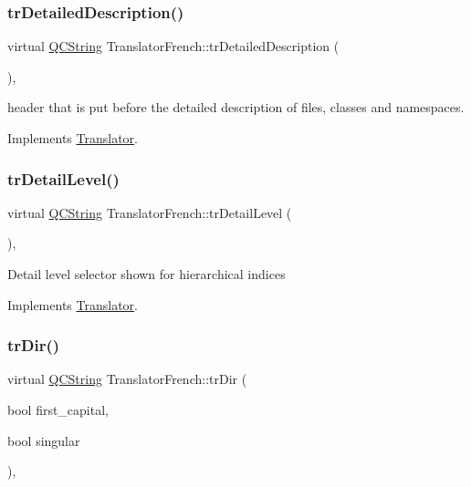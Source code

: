 \subsubsection{\texorpdfstring{trDetailedDescription()}{trDetailedDescription()}}
{\footnotesize\ttfamily virtual \mbox{\hyperlink{class_q_c_string}{Q\+C\+String}} Translator\+French\+::tr\+Detailed\+Description (\begin{DoxyParamCaption}{ }\end{DoxyParamCaption})\hspace{0.3cm}{\ttfamily [inline]}, {\ttfamily [virtual]}}

header that is put before the detailed description of files, classes and namespaces. 

Implements \mbox{\hyperlink{class_translator}{Translator}}.

\mbox{\label{class_translator_french_a60266dceed1707416a172e84c5279ef8}} 
\subsubsection{\texorpdfstring{trDetailLevel()}{trDetailLevel()}}
{\footnotesize\ttfamily virtual \mbox{\hyperlink{class_q_c_string}{Q\+C\+String}} Translator\+French\+::tr\+Detail\+Level (\begin{DoxyParamCaption}{ }\end{DoxyParamCaption})\hspace{0.3cm}{\ttfamily [inline]}, {\ttfamily [virtual]}}

Detail level selector shown for hierarchical indices 

Implements \mbox{\hyperlink{class_translator}{Translator}}.

\mbox{\label{class_translator_french_aaadcf0f2bb9164d2a2b2a3b5b477e565}} 
\subsubsection{\texorpdfstring{trDir()}{trDir()}}
{\footnotesize\ttfamily virtual \mbox{\hyperlink{class_q_c_string}{Q\+C\+String}} Translator\+French\+::tr\+Dir (\begin{DoxyParamCaption}\item[{bool}]{first\+\_\+capital,  }\item[{bool}]{singular }\end{DoxyParamCaption})\hspace{0.3cm}{\ttfamily [inline]}, {\ttfamily [virtual]}}

